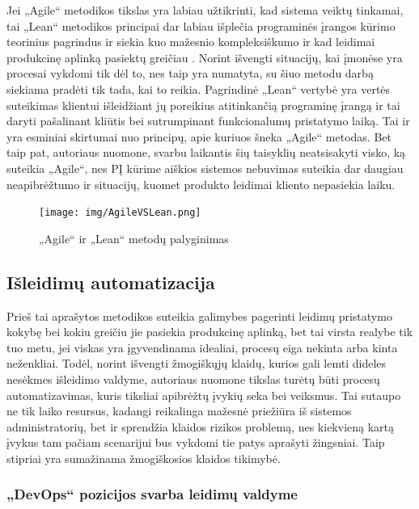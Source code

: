 \documentclass{VUMIFPSkursinis}
\begin{document}
Jei „Agile“ metodikos tikslas yra labiau užtikrinti, kad sistema veiktų tinkamai, tai „Lean“ metodikos principai dar labiau išplečia programinės įrangos kūrimo teorinius pagrindus ir siekia kuo mažesnio kompleksiškumo ir kad leidimai produkcinę aplinką pasiektų greičiau \cite{SaltSestas}. Norint išvengti situacijų, kai įmonėse yra procesai vykdomi tik dėl to, nes taip yra numatyta, su šiuo metodu darbą siekiama pradėti tik tada, kai to reikia. Pagrindinė „Lean“ vertybė yra vertės suteikimas klientui išleidžiant jų poreikius atitinkančią programinę įrangą ir tai daryti pašalinant kliūtis bei sutrumpinant funkcionalumų pristatymo laiką. Tai ir yra esminiai skirtumai nuo principų, apie kuriuos šneka „Agile“ metodas. Bet taip pat, autoriaus nuomone, svarbu laikantis šių taisyklių neatsisakyti visko, ką suteikia „Agile“, nes PĮ kūrime aiškios sistemos nebuvimas suteikia dar daugiau neapibrėžtumo ir situacijų, kuomet produkto leidimai kliento nepasiekia laiku.

\begin{figure}[H]
    \centering
    \texttt{[image: img/AgileVSLean.png]}
    \caption{„Agile“ ir „Lean“ metodų palyginimas}
    \label{img:mlp}
\end{figure}

\subsection{Išleidimų automatizacija}

Prieš tai aprašytos metodikos suteikia galimybes pagerinti leidimų pristatymo kokybę bei kokiu greičiu jie pasiekia produkcinę aplinką, bet tai virsta realybe tik tuo metu, jei viskas yra įgyvendinama idealiai, procesų eiga nekinta arba kinta neženkliai. Todėl, norint išvengti žmogiškųjų klaidų, kurios gali lemti dideles nesėkmes išleidimo valdyme, autoriaus nuomone tikslas turėtų būti procesų automatizavimas, kuris tiksliai apibrėžtų įvykių seka bei veiksmus. Tai sutaupo ne tik laiko resursus, kadangi reikalinga mažesnė priežiūra iš sistemos administratorių, bet ir sprendžia klaidos rizikos problemą, nes kiekvieną kartą įvykus tam pačiam scenarijui bus vykdomi tie patys aprašyti žingsniai. Taip stipriai yra sumažinama žmogiškosios klaidos tikimybė.

    \subsubsection{„DevOps“ pozicijos svarba leidimų valdyme}
\end{document}
